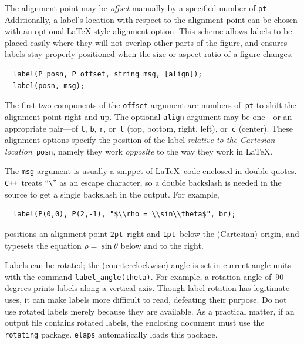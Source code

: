 \documentclass[12pt,letterpaper]{book}
\newcommand{\code}[1]{\texttt{#1}}
\newcommand{\CXX}{\code{C++}}
\newcommand{\teximath}[1]{$#1$}
\newcommand{\findex}[1]{\ignorespaces}
\begin{document}
The alignment point may be \emph{offset} manually by a specified
number of \code{pt}. Additionally, a label's location with respect to
the alignment point can be chosen with an optional \LaTeX-style
alignment option. This scheme allows labels to be placed easily where
they will not overlap other parts of the figure, and ensures labels
stay properly positioned when the size or aspect ratio of a figure
changes.
\findex{label}
\begin{verbatim}
  label(P posn, P offset, string msg, [align]);
  label(posn, msg);
\end{verbatim}
The first two components of the \code{offset} argument are numbers
of~\code{pt} to shift the alignment point right and up.  The optional
\code{align} argument may be one---or an appropriate pair---of
\code{t}, \code{b}, \code{r}, or~\code{l} (top, bottom, right, left),
or~\code{c} (center). These alignment options specify the position of
the label \emph{relative to the Cartesian location}~\code{posn},
namely they work \emph{opposite} to the way they work in \LaTeX.
\begin{center}
  \qquad
  
\end{center}

The \code{msg} argument is usually a snippet of \LaTeX\ code enclosed
in double quotes. \CXX~treats ``\verb+\+'' as an escape character, so
a double backslash is needed in the source to get a single backslash
in the output. For example,
\begin{verbatim}
  label(P(0,0), P(2,-1), "$\\rho = \\sin\\theta$", br);
\end{verbatim}
positions an alignment point \code{2pt}~right and \code{1pt}~below the
(Cartesian) origin, and typesets the equation
\teximath{\rho=\sin\theta} below and to the right.

Labels can be rotated; the (counterclockwise) angle is set in current
angle units with the command \code{label\_angle(theta)}. For example,
a rotation angle of~90 degrees prints labels along a vertical
axis. Though label rotation has legitimate uses, it can make labels
more difficult to read, defeating their purpose. Do not use rotated
labels merely because they are available. As a practical matter, if an
output file contains rotated labels, the enclosing document must use
the \code{rotating} package. \code{elaps} automatically loads this
package.
\end{document}
